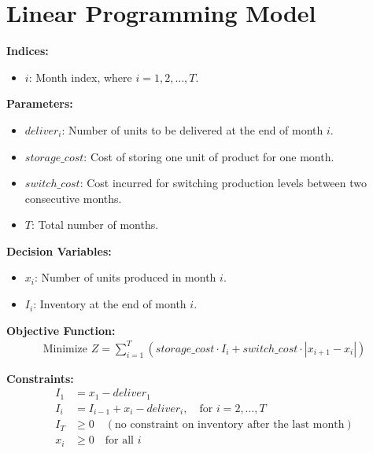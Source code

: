 \documentclass{article}
\begin{document}
\section*{Linear Programming Model}

\textbf{Indices:}
\begin{itemize}
    \item $i$: Month index, where $i = 1, 2, \ldots, T$.
\end{itemize}

\textbf{Parameters:}
\begin{itemize}
    \item $deliver_i$: Number of units to be delivered at the end of month $i$.
    \item $storage\_cost$: Cost of storing one unit of product for one month.
    \item $switch\_cost$: Cost incurred for switching production levels between two consecutive months.
    \item $T$: Total number of months.
\end{itemize}

\textbf{Decision Variables:}
\begin{itemize}
    \item $x_i$: Number of units produced in month $i$.
    \item $I_i$: Inventory at the end of month $i$.
\end{itemize}

\textbf{Objective Function:}
\begin{align*}
    \text{Minimize } Z = \sum_{i=1}^{T} \left( storage\_cost \cdot I_i + switch\_cost \cdot |x_{i+1} - x_i| \right)
\end{align*}

\textbf{Constraints:}
\begin{align*}
    I_1 & = x_1 - deliver_1 \\
    I_i & = I_{i-1} + x_i - deliver_i, \quad \text{for } i = 2, \ldots, T \\
    I_T & \geq 0 \quad (\text{no constraint on inventory after the last month}) \\
    x_i & \geq 0 \quad \text{for all } i
\end{align*}
\end{document}
